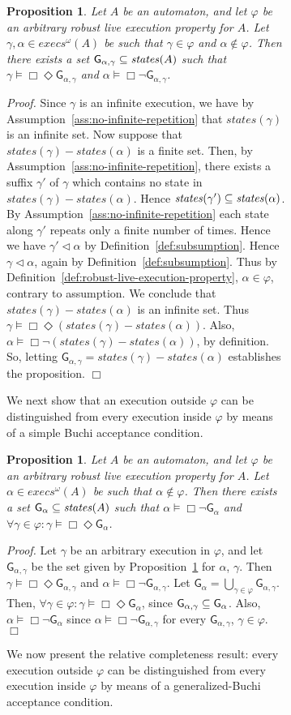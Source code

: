 \documentclass[11pt]{article}
\newcommand{\bp}{\begin{proposition}}
\newcommand{\ep}{\end{proposition}}
\newcommand{\bpr}{\begin{proof}}
\newcommand{\epr}{\end{proof}}
\newcommand{\UN}{\bigcup}
\newcommand{\fa}{\forall}
\newcommand{\sat}{\models}
\newcommand{\G}{\mathsf{G}}
\newcommand{\al}{\alpha}
\newcommand{\iexecs}{\mathit{execs}^\omega}
\newcommand{\ga}{\gamma}
\newcommand{\states}{\mathit{states}}
\newcommand{\subs}{\lhd}		\newcommand{\suc}{\mathit{succ}}	\newcommand{\topp}{\mathit{top}}\newcommand{\trace}{\mathit{trace}}
\newcommand{\iof}{\Box \Diamond}
\newcommand{\always}{\Box}
\newtheorem{proposition}[theorem]{Proposition}
\newenvironment{proof}{\vspace{-1.0ex}\textit{Proof.} }
                      {\hfill{$\Box$}}
\begin{document}
\begin{figure}[htb]
\begin{figure}[htb]
\bp
\label{prop:distinguish-two-execs}
Let $A$ be an automaton, and let $\varphi$ be an arbitrary
robust live execution property for $A$.
Let  $\ga, \al \in \iexecs(A)$ be such that 
$\ga \in \varphi$ and $\al \not\in \varphi$. 
Then there exists a set $\G_{\al,\ga} \sub \states(A)$ such that
$\ga \sat \iof \G_{\al,\ga}$ and $\al \sat \always \neg \G_{\al,\ga}$.
\ep
\bpr
Since $\ga$ is an infinite execution, we have by 
Assumption~\ref{ass:no-infinite-repetition} that $\states(\ga)$ is an infinite set. 
Now suppose that $\states(\ga) - \states(\al)$ is a finite set.
Then, by Assumption~\ref{ass:no-infinite-repetition}, there exists a suffix 
$\ga'$ of $\ga$ which contains no state in $\states(\ga) - \states(\al)$.
Hence $\states(\ga') \sub \states(\al)$. 
By Assumption~\ref{ass:no-infinite-repetition}
each state along $\ga'$ repeats only a finite number of times. 
Hence we have $\ga' \subs \al$ by Definition~\ref{def:subsumption}.
Hence $\ga \subs \al$, again by Definition~\ref{def:subsumption}.
Thus by Definition~\ref{def:robust-live-execution-property}, $\al \in \varphi$,
contrary to assumption. 
We conclude that $\states(\ga) - \states(\al)$ is an infinite set.
Thus $\ga \sat \iof (\states(\ga) - \states(\al))$.
Also, $\al \sat \always \neg (\states(\ga) - \states(\al))$, by definition.
So, letting $\G_{\al,\ga} = \states(\ga) - \states(\al)$ establishes the proposition.
\epr

We next show that an execution outside $\varphi$ can be distinguished
from every execution inside $\varphi$ by means of a simple Buchi
acceptance condition.

\bp
\label{prop:distinguish-nonlive-exec}
Let $A$ be an automaton, and let $\varphi$ be an arbitrary
robust live execution property for $A$.
Let  $\al \in \iexecs(A)$ be such that $\al \not\in \varphi$. 
Then there exists a set $\G_{\al} \sub \states(A)$ such that
$\al \sat \Box \neg \G_{\al}$ and
$\fa \ga \in \varphi: \ga \sat \iof \G_{\al}$.
\ep
\bpr
Let $\ga$ be an arbitrary execution in $\varphi$, and let $\G_{\al,\ga}$ be the set
given by Proposition~\ref{prop:distinguish-two-execs} for $\al$, $\ga$.
Then $\ga \sat \iof \G_{\al,\ga}$ and $\al \sat \Box \neg \G_{\al,\ga}$.
Let $\G_{\al} = \UN_{\ga \in \varphi} \G_{\al,\ga}$. Then,
$\fa \ga \in \varphi: \ga \sat \iof \G_{\al}$, since $\G_{\al,\ga} \sub \G_{\al}$.
Also, 
$\al \sat \Box \neg \G_{\al}$ since $\al \sat \Box \neg \G_{\al,\ga}$ for every 
$\G_{\al,\ga}$, $\ga \in \varphi$. 
\epr

We now present the relative completeness result: every 
execution outside $\varphi$ can be distinguished
from every execution inside $\varphi$ by means of a 
generalized-Buchi acceptance condition.



\end{figure}
\end{figure}
\end{document}
